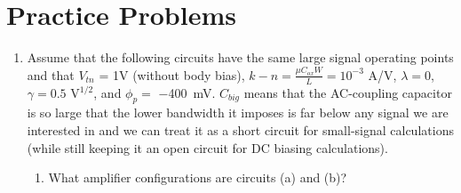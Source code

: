 \section{Practice Problems}

\begin{enumerate}
    \item Assume that the following circuits have the same large signal operating points and that $V_{tn}$ = 1V (without body bias), $k-n = \frac{\mu C_{ox} W}{L} = 10^{-3}$ A/V\sq, $\lambda = 0$, $\gamma = 0.5$ V$^{1/2}$, and $\phi_p = $ \SI{-400}{\milli \V}. $C_{big}$ means that the AC-coupling capacitor is so large that the lower bandwidth it imposes is far below any signal we are interested in and we can treat it as a short circuit for small-signal calculations (while still keeping it an open circuit for DC biasing calculations).
    
    \begin{enumerate}
        \item What amplifier configurations are circuits (a) and (b)?
        \begin{Ans}

        \end{Ans}
        
    \end{enumerate}
\end{enumerate}